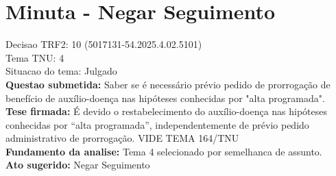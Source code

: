 \documentclass{article}
\begin{document}
\section*{Minuta - Negar Seguimento}
Decisao TRF2: 10 (5017131-54.2025.4.02.5101)\\
Tema TNU: 4\\
Situacao do tema: Julgado\\
\textbf{Questao submetida:} Saber se é necessário prévio pedido de prorrogação de benefício de auxílio-doença nas hipóteses conhecidas por "alta programada".\\
\textbf{Tese firmada:} É devido o restabelecimento do auxílio-doença nas hipóteses conhecidas por “alta programada”, independentemente de prévio pedido administrativo de prorrogação. VIDE TEMA 164/TNU\\
\textbf{Fundamento da analise:} Tema 4 selecionado por semelhanca de assunto.\\
\textbf{Ato sugerido:} Negar Seguimento
\end{document}
